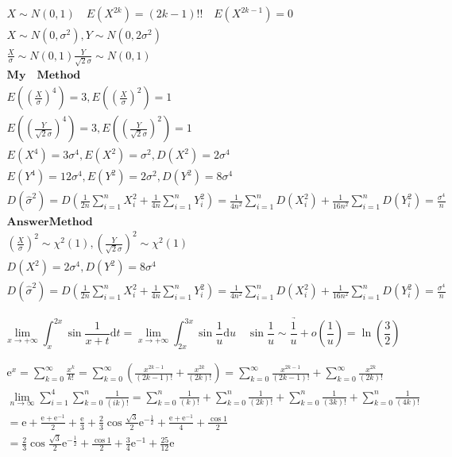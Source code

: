 \documentclass{article}
\begin{document}
\begin{align*}
    X \sim N(0,1) \quad E(X^{2k}) = (2k-1)!! \quad E(X^{2k-1}) = 0 \\ 
    X \sim N(0,\sigma^2),Y \sim N(0,2\sigma^2) \\ 
    \frac{X}{\sigma} \sim N(0,1) \frac{Y}{\sqrt{2}\sigma} \sim N(0,1) \\ 
    \mathbf{My \quad Method} \\ 
    E(\left(\frac{X}{\sigma}\right)^4) = 3 , E(\left(\frac{X}{\sigma}\right)^2) = 1 \\ 
    E(\left(\frac{Y}{\sqrt{2}\sigma}\right)^4) = 3 , E(\left(\frac{Y}{\sqrt{2}\sigma}\right)^2) = 1 \\ 
    E(X^4) = 3\sigma^4 , E(X^2) = \sigma^2 , D(X^2) = 2\sigma^4 \\
    E(Y^4) = 12\sigma^4 , E(Y^2) = 2\sigma^2 , D(Y^2) = 8\sigma^4 \\
    D(\hat{\sigma}^2) = D(\frac{1}{2n}\sum_{i=1}^nX_{i}^2+\frac{1}{4n}\sum_{i=1}^nY_{i}^2) = \frac{1}{4n^2}\sum_{i=1}^{n}D(X_{i}^2)+\frac{1}{16n^2}\sum_{i=1}^{n}D(Y_{i}^2) = \frac{\sigma^4}{n}
    \\
    \mathbf{Answer Method}  \\ 
    (\frac{X}{\sigma})^2 \sim \chi^2{(1)} , (\frac{Y}{\sqrt{2}\sigma})^2 \sim \chi^2{(1)}\\  
    D(X^2) = 2\sigma^4  , D(Y^2) = 8\sigma^4 \\ 
    D(\hat{\sigma}^2) = D(\frac{1}{2n}\sum_{i=1}^nX_{i}^2+\frac{1}{4n}\sum_{i=1}^nY_{i}^2) = \frac{1}{4n^2}\sum_{i=1}^{n}D(X_{i}^2)+\frac{1}{16n^2}\sum_{i=1}^{n}D(Y_{i}^2) = \frac{\sigma^4}{n}  
\end{align*}

\begin{displaymath}
    \lim_{x \to +\infty} \int_{x}^{2x} \sin\frac{1}{x+t}\mathrm{d}t = \lim_{x \to +\infty}\int_{2x}^{3x}\sin\frac{1}{u} \mathrm{d}u \quad \underrightarrow{\sin\frac{1}{u} \sim \frac{1}{u}+o(\frac{1}{u})} = \ln(\frac{3}{2}) 
\end{displaymath}

\begin{align*}
    \mathrm{e}^{x} = \sum_{k=0}^{\infty} \frac{x^{k}}{k!} = \sum_{k=0}^{\infty}\left(\frac{x^{2k-1}}{(2k-1)!}+\frac{x^{2k}}{(2k)!}\right) = \sum_{k=0}^{\infty}\frac{x^{2k-1}}{(2k-1)!}+\sum_{k=0}^{\infty}\frac{x^{2k}}{(2k)!} \\ 
    \lim_{n \to \infty} \sum_{i=1}^{4}\sum_{k=0}^{n} \frac{1}{(ik)!} = \sum_{k=0}^{n} \frac{1}{(k)!} + \sum_{k=0}^{n} \frac{1}{(2k)!} + \sum_{k=0}^{n} \frac{1}{(3k)!} + \sum_{k=0}^{n} \frac{1}{(4k)!} \\ 
    = \mathrm{e}+\frac{\mathrm{e}+\mathrm{e}^{-1}}{2}+\frac{\mathrm{e}}{3}+\frac{2}{3}\cos{\frac{\sqrt{3}}{2}}\mathrm{e}^{-\frac{1}{2}} + \frac{\mathrm{e}+\mathrm{e}^{-1}}{4}+\frac{\cos 1}{2} \\ 
    = \frac{2}{3}\cos{\frac{\sqrt{3}}{2}}\mathrm{e}^{-\frac{1}{2}} + \frac{\cos 1}{2} + \frac{3}{4}\mathrm{e}^{-1}+\frac{25}{12}\mathrm{e} 
\end{align*}
\end{document}
